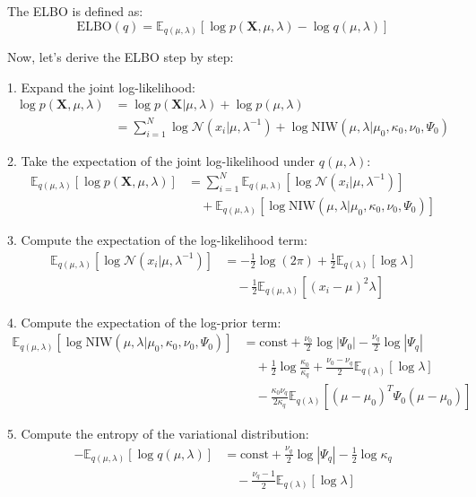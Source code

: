 \documentclass[11pt]{article}
\begin{document}
    The ELBO is defined as:
    $$
    \text{ELBO}(q) = \mathbb{E}_{q(\mu, \lambda)}[\log p(\mathbf{X}, \mu, \lambda) - \log q(\mu, \lambda)]
    $$

    Now, let's derive the ELBO step by step:

    1. Expand the joint log-likelihood:
    $$
    \begin{aligned}
        \log p(\mathbf{X}, \mu, \lambda) &= \log p(\mathbf{X} | \mu, \lambda) + \log p(\mu, \lambda) \\
        &= \sum_{i=1}^N \log \mathcal{N}(x_i | \mu, \lambda^{-1}) + \log \text{NIW}(\mu, \lambda | \mu_0, \kappa_0, \nu_0, \Psi_0)
    \end{aligned}
    $$

    2. Take the expectation of the joint log-likelihood under $q(\mu, \lambda)$:
    $$
    \begin{aligned}
        \mathbb{E}_{q(\mu, \lambda)}[\log p(\mathbf{X}, \mu, \lambda)] &= \sum_{i=1}^N \mathbb{E}_{q(\mu, \lambda)}[\log \mathcal{N}(x_i | \mu, \lambda^{-1})] \\
        &\quad + \mathbb{E}_{q(\mu, \lambda)}[\log \text{NIW}(\mu, \lambda | \mu_0, \kappa_0, \nu_0, \Psi_0)]
    \end{aligned}
    $$

    3. Compute the expectation of the log-likelihood term:
    $$
    \begin{aligned}
        \mathbb{E}_{q(\mu, \lambda)}[\log \mathcal{N}(x_i | \mu, \lambda^{-1})] &= -\frac{1}{2} \log(2\pi) + \frac{1}{2} \mathbb{E}_{q(\lambda)}[\log \lambda] \\
        &\quad - \frac{1}{2} \mathbb{E}_{q(\mu, \lambda)}[(x_i - \mu)^2 \lambda]
    \end{aligned}
    $$

    4. Compute the expectation of the log-prior term:
    $$
    \begin{aligned}
        \mathbb{E}_{q(\mu, \lambda)}[\log \text{NIW}(\mu, \lambda | \mu_0, \kappa_0, \nu_0, \Psi_0)] &= \text{const} + \frac{\nu_0}{2} \log |\Psi_0| - \frac{\nu_q}{2} \log |\Psi_q| \\
        &\quad + \frac{1}{2} \log \frac{\kappa_0}{\kappa_q} + \frac{\nu_0 - \nu_q}{2} \mathbb{E}_{q(\lambda)}[\log \lambda] \\
        &\quad - \frac{\kappa_0 \nu_q}{2\kappa_q} \mathbb{E}_{q(\lambda)}[(\mu - \mu_0)^T \Psi_0 (\mu - \mu_0)]
    \end{aligned}
    $$

    5. Compute the entropy of the variational distribution:
    $$
    \begin{aligned}
        -\mathbb{E}_{q(\mu, \lambda)}[\log q(\mu, \lambda)] &= \text{const} + \frac{\nu_q}{2} \log |\Psi_q| - \frac{1}{2} \log \kappa_q \\
        &\quad - \frac{\nu_q - 1}{2} \mathbb{E}_{q(\lambda)}[\log \lambda]
    \end{aligned}
    $$
\end{document}
